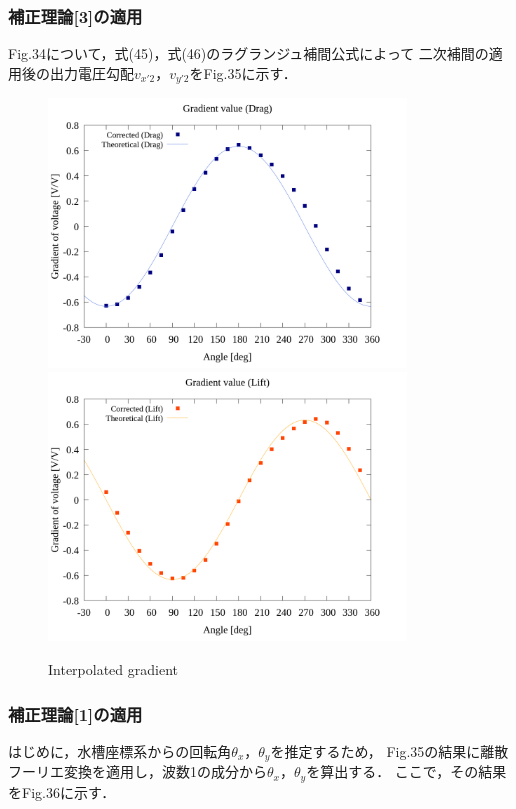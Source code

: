 \newpage

\subsubsection{補正理論[3]の適用}
Fig.34について，式(45)，式(46)のラグランジュ補間公式によって
二次補間の適用後の出力電圧勾配$v_{x'2}$，$v_{y'2}$をFig.35に示す．

\begin{figure}[htbp]
  \begin{center}
    \includegraphics[width=95mm]{../../02_workspace/result/2-ex/plot/21/21-3_interpolated_drag.png}
    \includegraphics[width=95mm]{../../02_workspace/result/2-ex/plot/21/21-3_interpolated_lift.png}
  \end{center}
  \caption{Interpolated gradient}
\end{figure}

\newpage

\subsubsection{補正理論[1]の適用}
はじめに，水槽座標系からの回転角$\theta_x$，$\theta_y$を推定するため，
Fig.35の結果に離散フーリエ変換を適用し，波数1の成分から$\theta_x$，$\theta_y$を算出する．
ここで，その結果をFig.36に示す．

